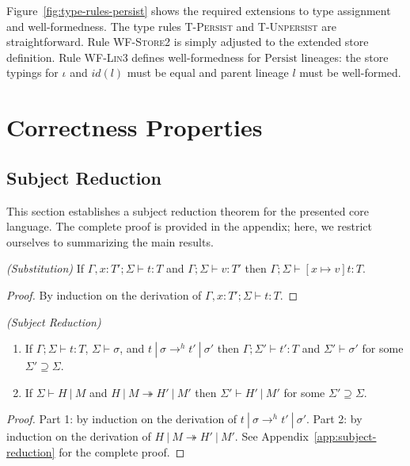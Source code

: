 Figure~\ref{fig:type-rules-persist} shows the required extensions to
type assignment and well-formedness. The type rules \textsc{T-Persist}
and \textsc{T-Unpersist} are straightforward. Rule \textsc{WF-Store2}
is simply adjusted to the extended store definition. Rule
\textsc{WF-Lin3} defines well-formedness for $\text{Persist}$
lineages: the store typings for $\iota$ and $id(l)$ must be equal and
parent lineage $l$ must be well-formed.


%
%

\section{Correctness Properties}\label{sec:correctness}

\subsection{Subject Reduction}\label{sec:subject-reduction}

This section establishes a subject reduction theorem for the presented
core language. The complete proof is provided in the appendix; here,
we restrict ourselves to summarizing the main results.

\begin{lem}
\emph{(Substitution)}\label{th:subst}
If $\Gamma , x : T' ; \Sigma \vdash t : T$ and $\Gamma ; \Sigma \vdash v : T'$ then $\Gamma ; \Sigma \vdash [x \mapsto v]t : T$.
\end{lem}
\begin{proof}
By induction on the derivation of $\Gamma , x : T' ; \Sigma \vdash t : T$.
\end{proof}


\begin{thm}
\emph{(Subject Reduction)}\label{th:subject-reduction}

\begin{enumerate}

\item If $\Gamma ; \Sigma \vdash t : T$, $\Sigma \vdash \sigma$, and $t~|~\sigma \rightarrow^h t'~|~\sigma'$ then $\Gamma ; \Sigma' \vdash t' : T$ and $\Sigma' \vdash \sigma'$ for some $\Sigma' \supseteq \Sigma$.

\item If $\Sigma \vdash H~|~M$ and $H~|~M \twoheadrightarrow H'~|~M'$ then $\Sigma' \vdash H'~|~M'$ for some $\Sigma' \supseteq \Sigma$.

\end{enumerate}

\end{thm}
\begin{proof}
  Part 1: by induction on the derivation of $t~|~\sigma \rightarrow^h
  t'~|~\sigma'$. Part 2: by induction on the derivation of $H~|~M
  \twoheadrightarrow H'~|~M'$. See
  Appendix~\ref{app:subject-reduction} for the complete proof.
\end{proof}



